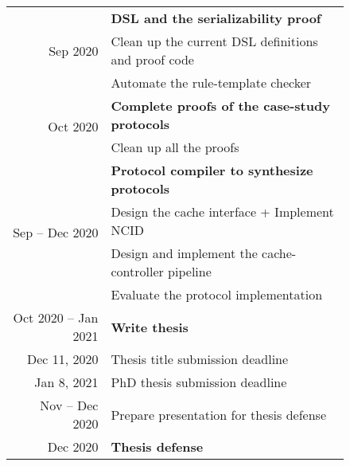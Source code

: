 \begin{figure}[h]
  \renewcommand{\arraystretch}{1.25}
  \centering\small
  \begin{tabular}{r|l}
    \hline
    \multirow{3}{*}{Sep 2020} & \bf \hemiola{} DSL and the serializability proof \\
    & \quad Clean up the current DSL definitions and proof code \\
    & \quad Automate the rule-template checker \\
    \hline
    \multirow{2}{*}{Oct 2020} & \bf Complete proofs of the case-study protocols \\
    & \quad Clean up all the proofs \\
    \hline
    \multirow{4}{*}{Sep -- Dec 2020} & \bf Protocol compiler to synthesize \hemiola{} protocols \\
    & \quad Design the cache interface + Implement NCID \\
    & \quad Design and implement the cache-controller pipeline \\
    & \quad Evaluate the protocol implementation \\
    \hline
    Oct 2020 -- Jan 2021 & \bf Write thesis \\
    Dec 11, 2020 & \quad Thesis title submission deadline \\
    Jan 8, 2021 & \quad PhD thesis submission deadline \\
    Nov -- Dec 2020 & Prepare presentation for thesis defense \\
    Dec 2020 & \bf Thesis defense \\
    \hline
  \end{tabular}
\end{figure}


